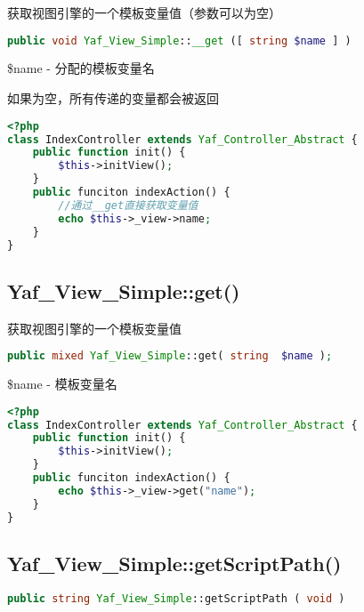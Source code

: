 获取视图引擎的一个模板变量值（参数可以为空）

\begin{lstlisting}[language=PHP]
public void Yaf_View_Simple::__get ([ string $name ] )
\end{lstlisting}


\begin{compactitem}
\item \$name - 分配的模板变量名

如果为空，所有传递的变量都会被返回

\end{compactitem}



\begin{lstlisting}[language=PHP]
<?php
class IndexController extends Yaf_Controller_Abstract {
    public function init() {
        $this->initView();
    }
    public funciton indexAction() {
        //通过__get直接获取变量值
        echo $this->_view->name;
    }
}
\end{lstlisting}


\subsection{Yaf\_View\_Simple::get()}

获取视图引擎的一个模板变量值

\begin{lstlisting}[language=PHP]
public mixed Yaf_View_Simple::get( string  $name );
\end{lstlisting}

\begin{compactitem}
\item \$name - 模板变量名
\end{compactitem}

\begin{lstlisting}[language=PHP]
<?php
class IndexController extends Yaf_Controller_Abstract {
    public function init() {
        $this->initView();
    }
    public funciton indexAction() {
        echo $this->_view->get("name");
    }
}
\end{lstlisting}



\subsection{Yaf\_View\_Simple::getScriptPath()}

\begin{lstlisting}[language=PHP]
public string Yaf_View_Simple::getScriptPath ( void )
\end{lstlisting}

